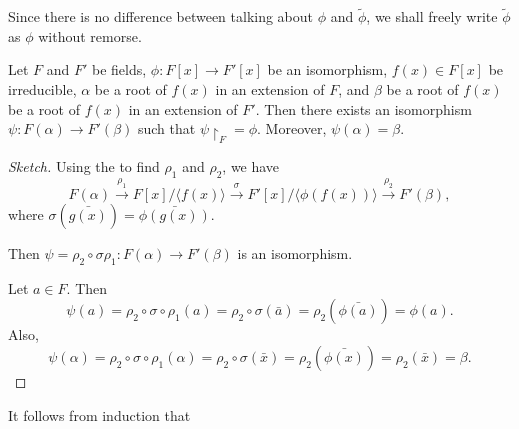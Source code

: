 \documentclass[notoc,notitlepage]{tufte-book}
\begin{document}
\begin{note}
  Since there is no difference between talking about $\phi$ and $\tilde{\phi}$, we shall
  freely write $\tilde{\phi}$ as $\phi$ without remorse.
\end{note}

\begin{lemma}\label{lemma:isomorphism_extension_lemma}
  Let $F$ and $F'$ be fields, $\phi : F[x] \to F'[x]$ be an isomorphism, $f(x) \in F[x]$ be
  irreducible, $\alpha$ be a root of $f(x)$ in an extension of $F$, and $\beta$ be a root of
  $f(x)$ be a root of $f(x)$ in an extension of $F'$. Then there exists an isomorphism
  $\psi : F(\alpha) \to F'(\beta)$ such that $\psi \restriction_F = \phi$. Moreover,
  $\psi(\alpha) = \beta$.
\end{lemma}

\begin{proof}[Sketch]
  Using the  to find $\rho_1$ and $\rho_2$, we have
  \begin{equation*}
    F(\alpha) \overset{\rho_1}{\to} F[x] \Big/ \langle f(x) \rangle \overset{\sigma}{\to}
    F'[x] \Big/ \langle \phi(f(x)) \rangle \overset{\rho_2}{\to} F'(\beta),
  \end{equation*}
   where $\sigma(\bar{g(x)}) = \bar{\phi(g(x))}$. 
  
  Then $\psi = \rho_2 \circ \sigma \rho_1 : F(\alpha) \to F'(\beta)$ is an isomorphism.

  Let $a \in F$. Then
  \begin{equation*}
    \psi(a) = \rho_2 \circ \sigma \circ \rho_1 (a) = \rho_2 \circ \sigma(\bar{a}) 
      = \rho_2(\bar{\phi(a)}) = \phi(a).
  \end{equation*}
  Also,
  \begin{equation*}
    \psi(\alpha) = \rho_2 \circ \sigma \circ \rho_1(\alpha) = \rho_2 \circ \sigma(\bar{x}) 
      = \rho_2(\bar{\phi(x)}) = \rho_2(\bar{x}) = \beta.
  \end{equation*}
\end{proof}

It follows from induction that
\end{document}
